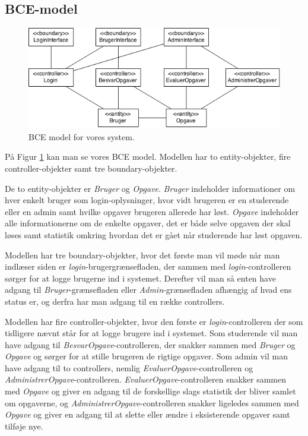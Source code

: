 \documentclass[11pt, a4paper]{article}
\begin{document}
\subsection{BCE-model}
\begin{figure}[h]
  \centering
  \includegraphics[width=0.8\linewidth]{figures/BCE-Model.png}
  \caption{BCE model for vores system.}
  \label{fig:bce_model}
\end{figure}
På Figur \ref{fig:bce_model} kan man se vores BCE model. Modellen har to entity-objekter, fire controller-objekter samt tre boundary-objekter.

De to entity-objekter er \emph{Bruger} og \emph{Opgave}. \emph{Bruger} indeholder informationer om hver enkelt bruger som login-oplysninger, hvor vidt brugeren er en studerende eller en admin samt hvilke opgaver brugeren allerede har løst. \emph{Opgave} indeholder alle informationerne om de enkelte opgaver, det er både selve opgaven der skal løses samt statistik omkring hvordan det er gået når studerende har løst opgaven.

Modellen har tre boundary-objekter, hvor det første man vil møde når man indlæser siden er \textit{login}-brugergrænsefladen, der sammen med \emph{login}-controlleren sørger for at logge brugerne ind i systemet. Derefter vil man så enten have adgang til \emph{Bruger}-grænsefladen eller \emph{Admin}-grænsefladen afhængig af hvad ens status er, og derfra har man adgang til en række controllers.

Modellen har fire controller-objekter, hvor den første er \emph{login}-controlleren der som tidligere nævnt står for at logge brugere ind i systemet. Som studerende vil man have adgang til \emph{BesvarOpgave}-controlleren, der snakker sammen med \emph{Bruger} og \emph{Opgave} og sørger for at stille brugeren de rigtige opgaver. Som admin vil man have adgang til to controllers, nemlig \emph{EvaluerOpgave}-controlleren og \emph{AdministrerOpgave}-controlleren. \emph{EvaluerOpgave}-controlleren snakker sammen med \emph{Opgave} og giver en adgang til de forskellige slags statistik der bliver samlet om opgaverne, og \emph{AdministrerOpgave}-controlleren snakker ligeledes sammen med \emph{Opgave} og giver en adgang til at slette eller ændre i eksisterende opgaver samt tilføje nye.
\end{document}
